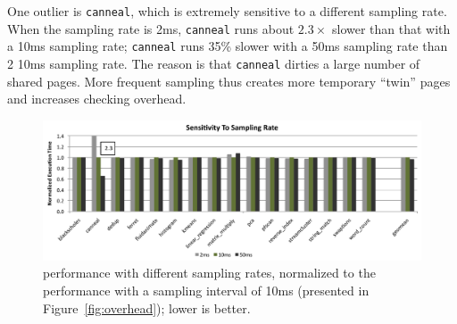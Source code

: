 One outlier is \texttt{canneal}, which is extremely sensitive to a different sampling rate.  When the sampling rate is 2ms, \texttt{canneal} runs about $2.3\times$ slower than that with  a 10ms sampling rate; \texttt{canneal} runs 35\% slower with a 50ms sampling rate than 2 10ms
sampling rate. The reason is that \texttt{canneal} dirties a large number of shared pages. More frequent sampling thus creates more temporary ``twin'' pages and increases checking overhead.


\begin{figure}[!t]
\centering
\includegraphics[width=5in]{sheriff/figure/sensitivity}
\caption{\sheriffdetect{} performance with different sampling rates,  normalized to the performance with a sampling interval of 10ms (presented in Figure~\ref{fig:overhead}); lower is better.
\label{fig:sensitivity}}
\end{figure}

\begin{table}[!t]
\centering
{}
\caption{
\sheriffdetect{} precision with different sampling rates, including the number of falsely-shared objects and interleaved writes. We omit those benchmarks with no observed cases of false sharing.
\label{table:samplingquality}}
\end{table}

